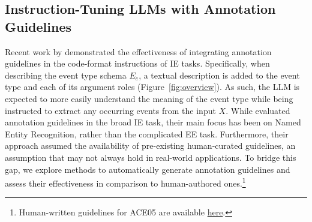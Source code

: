 \subsection{Instruction-Tuning LLMs with Annotation Guidelines}
\label{sec:guideline_generation}

Recent work by \citet{sainz2024gollie} demonstrated the effectiveness of integrating annotation guidelines in the code-format instructions of IE tasks. Specifically, when describing the event type schema $E_e$, a textual description is added to the event type and each of its argument roles (Figure~\ref{fig:overview}). As such, the LLM is expected to more easily understand the meaning of the event type while being instructed to extract any occurring events from the input $X$. While \citet{sainz2024gollie} evaluated annotation guidelines in the broad IE task, their main focus has been on Named Entity Recognition, rather than the complicated EE task. 
Furthermore, their approach assumed the availability of pre-existing human-curated guidelines, an assumption that may not always hold in real-world applications. To bridge this gap, we explore methods to automatically generate annotation guidelines and assess their effectiveness in comparison to human-authored ones.\footnote{Human-written guidelines for ACE05 are available \href{https://www.ldc.upenn.edu/sites/www.ldc.upenn.edu/files/english-events-guidelines-v5.4.3.pdf}{here}.}


